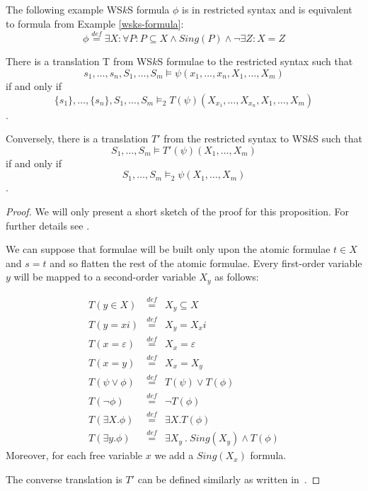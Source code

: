   \noindent\hrulefill
  \begin{example}
  The following example WS$k$S formula $\phi$ is in restricted syntax and is
  equivalent to formula from Example \ref{wsks-formula}:
  \begin{equation}
   \phi \overset{\mathit{def}}{=} \exists X: \forall P: P \subseteq X \wedge
   \mathit{Sing}(P) \wedge \neg\exists Z: X = Z
  \end{equation}
   \hrulefill
  \end{example}\label{wsks-formula-restricted}
	
	\begin{prop}
There is a translation T from WS$k$S formulae to the restricted syntax such that
\begin{equation}
s_1,\ldots,s_n,S_1,\ldots,S_m \models
\psi(x_1,\ldots,x_n,X_1,\ldots,X_m)
\end{equation} if and only if \begin{equation}\{s_1\},\ldots,\{s_n\},S_1,\ldots,S_m \models_2
T(\psi)(X_{x_1},\ldots,X_{x_n}, X_1,\ldots,X_m)
\end{equation}.

 Conversely, there is a
translation $T'$ from the restricted syntax to WS$k$S such that \begin{equation}S_1,\ldots,S_m
\models T'(\psi)(X_1,\ldots,X_m)\end{equation} if and only if \begin{equation}S_1,\ldots,S_m \models_2
\psi(X_1,\ldots,X_m)\end{equation}.
	\end{prop}
	\begin{proof}
We will only present a short sketch of the proof for this proposition. For
further details see \cite{tata}.
	
We can suppose that formulae will be built only upon the atomic formulae $t \in
X$ and $s = t$ and so flatten the rest of the atomic formulae. Every first-order
variable $y$ will be mapped to a second-order variable $X_y$ as follows:
	
	 \begin{eqnarray}
	 T(y \in X) & \overset{\mathit{def}}{=} & X_y \subseteq X\\
	 T(y = xi) & \overset{\mathit{def}}{=} &  X_y = X_xi\\
	 T(x = \varepsilon) & \overset{\mathit{def}}{=} & X_x = \varepsilon\\
	 T(x = y) & \overset{\mathit{def}}{=} & X_x = X_y\\
	 T(\psi \vee \phi) & \overset{\mathit{def}}{=} & T(\psi) \vee T(\phi)\\
	 T(\neg\phi) & \overset{\mathit{def}}{=} & \neg T(\phi)\\
	 T(\exists X.\phi) & \overset{\mathit{def}}{=} & \exists X.T(\phi)\\
	 T(\exists y.\phi) & \overset{\mathit{def}}{=} & \exists X_y\ .\ Sing(X_y) \wedge T(\phi)
	 \end{eqnarray}
	Moreover, for each free variable $x$ we add a $Sing(X_x)$ formula. 
	
	The converse translation is $T'$ can be defined similarly as written
	in~\cite{tata}.
	\end{proof}
	
